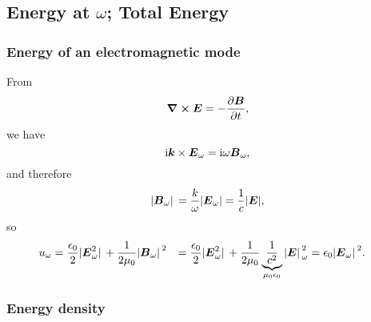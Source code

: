 \documentclass[hyperref, a4paper]{article}
\newcommand*{\ii}{\mathrm{i}}
\def\\{}%
\begin{document}
\subsection{Energy at $\omega$; Total Energy}

\subsubsection{Energy of an electromagnetic mode}\label{sec:correlation.energy.mode}

From 
\[
    \curl{\vb*{E}} = - \pdv{\vb*{B}}{t},
\]
we have 
\[
    \ii \vb*{k} \times \vb*{E}_\omega = \ii \omega \vb*{B}_\omega,
\]
and therefore 
\[
    \abs*{\vb*{B}_\omega} = \frac{k}{\omega} \abs{\vb*{E}_\omega} = \frac{1}{c} \abs{\vb*{E}},
\]
so 
\begin{equation}
    \begin{aligned}
        u_\omega &= \frac{\epsilon_0}{2} \abs*{\vb*{E}_\omega^2 }
        + \frac{1}{2 \mu_0} \abs*{\vb*{B}_\omega}^2 \\
        &= \frac{\epsilon_0}{2} \abs*{\vb*{E}_\omega^2} 
        + \frac{1}{2 \mu_0} \underbrace{\frac{1}{c^2}}_{\mu_0 \epsilon_0} \abs*{\vb*{E}}_\omega^2  \\
        &= \epsilon_0 \abs*{\vb*{E}_\omega}^2.
    \end{aligned}
\end{equation}

\subsubsection{Energy density}
\end{document}

